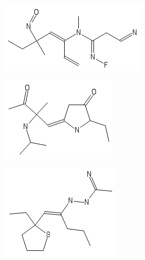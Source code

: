 \documentclass{article}
\begin{document}
\begin{figure}
    \centering
    \begin{subfigure}{0.3\textwidth}
        \includegraphics[width=\textwidth]{m1.png}
    \end{subfigure}
    \begin{subfigure}{0.3\textwidth}
        \includegraphics[width=\textwidth]{m3.png}
    \end{subfigure}
    \begin{subfigure}{0.3\textwidth}
        \includegraphics[width=\textwidth]{m4.png}

\end{subfigure}
\end{figure}
\end{document}
